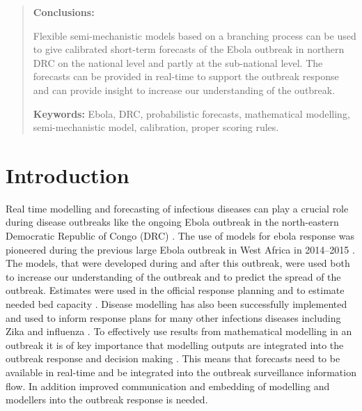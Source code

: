\documentclass[12pt]{article}
\begin{document}
\begin{abstract}
  \medskip
  
  {\bf Conclusions:}

  Flexible semi-mechanistic models based on a branching process can be used to give calibrated short-term forecasts of the Ebola outbreak in northern DRC on the national level and partly at the sub-national level. The forecasts can be provided in real-time to support the outbreak response and can provide  insight to increase our understanding of the outbreak.

  \medskip

  {\bf Keywords:} Ebola, DRC, probabilistic forecasts, mathematical modelling, semi-mechanistic model, calibration, proper scoring rules.

\end{abstract}

\newpage

\tableofcontents

\newpage

\section{Introduction}


Real time modelling and forecasting of infectious diseases can play a crucial role during disease outbreaks like the ongoing Ebola outbreak in the north-eastern Democratic Republic of Congo (DRC) \cite{heesterbeekModelingInfectiousDisease2015,riversUsingOutbreakScience2019a}. The use of models for ebola response was pioneered during the previous large Ebola outbreak in West Africa in 2014--2015 \cite{chretienMathematicalModelingWest}. The models, that were developed during and after this outbreak, were used both to increase our understanding of the outbreak and to predict the spread of the outbreak. Estimates were used in the official response planning \cite{whoebolaresponseteamEbolaVirusDisease2014} and to estimate needed bed capacity \cite{camachoTemporalChangesEbola2015}. Disease modelling has also been successfully implemented and used to inform response plans for many other infections diseases including Zika \cite{kobresSystematicReviewEvaluation2019} and influenza \cite{chretienInfluenzaForecastingHuman2014}. To effectively use results from mathematical modelling in an outbreak it is of key importance that modelling outputs are integrated into the outbreak response and decision making \cite{riversUsingOutbreakScience2019a}. This means that forecasts need to be available in real-time and be integrated into the outbreak surveillance information flow. In addition improved communication and embedding of modelling and modellers into the outbreak response is needed. 
\end{document}
